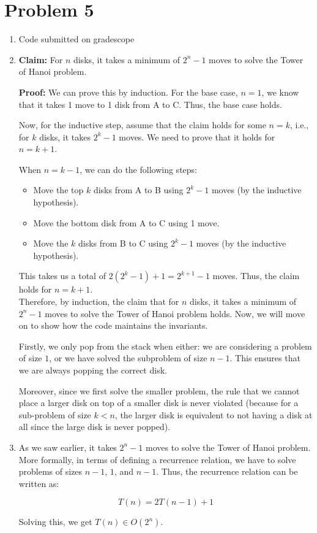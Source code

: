 \documentclass{cs1204}
\begin{document}
\section*{Problem 5}
\begin{enumerate}[label=(\alph*)]
    \item Code submitted on gradescope
    
    \item \textbf{Claim:} For $n$ disks, it takes a minimum of $2^n - 1$ moves to solve the Tower of Hanoi problem.
    
    \textbf{Proof:} We can prove this by induction. For the base case, $n = 1$, we know that it takes 1 move to 1 disk from A to C. Thus, the base case holds.

    Now, for the inductive step, assume that the claim holds for some $n = k$, i.e., for $k$ disks, it takes $2^k - 1$ moves. We need to prove that it holds for $n = k + 1$.

    When $n = k - 1$, we can do the following steps:
    \begin{itemize}
        \item Move the top $k$ disks from A to B using $2^k - 1$ moves (by the inductive hypothesis).
        \item Move the bottom disk from A to C using 1 move.
        \item Move the $k$ disks from B to C using $2^k - 1$ moves (by the inductive hypothesis).
    \end{itemize}

    This takes us a total of $2(2^k - 1) + 1 = 2^{k+1} - 1$ moves. Thus, the claim holds for $n = k + 1$. \\

    Therefore, by induction, the claim that for $n$ disks, it takes a minimum of $2^n - 1$ moves to solve the Tower of Hanoi problem holds. Now, we will move on to show how the code maintains the invariants.

    Firstly, we only pop from the stack when either: we are considering a problem of size $1$, or we have solved the subproblem of size $n - 1$. This ensures that we are always popping the correct disk.

    Moreover, since we first solve the smaller problem, the rule that we cannot place a larger disk on top of a smaller disk is never violated (because for a sub-problem of size $k < n$, the larger disk is equivalent to not having a disk at all since the large disk is never popped). \\

    \item As we saw earlier, it takes $2^n - 1$ moves to solve the Tower of Hanoi problem. More formally, in terms of defining a recurrence relation, we have to solve problems of sizes $n - 1$, $1$, and $n - 1$. Thus, the recurrence relation can be written as:

    \[ T(n) = 2T(n - 1) + 1 \]

    Solving this, we get $T(n) \in O(2^n)$.

\end{enumerate}
\end{document}
